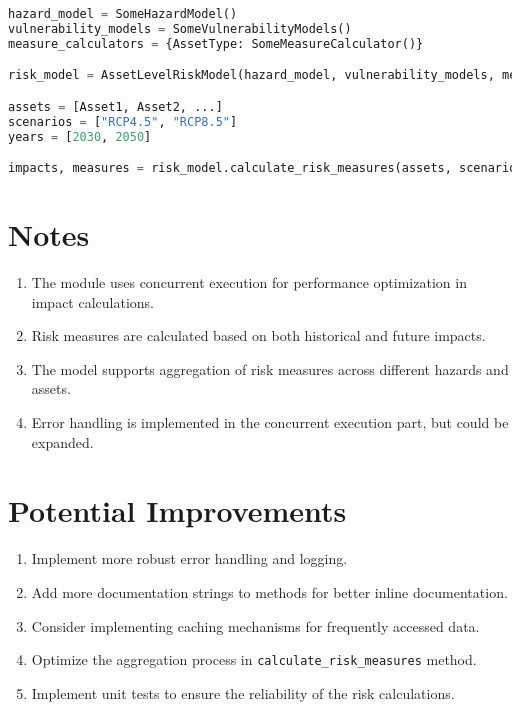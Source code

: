 \documentclass{article}
\begin{document}
\begin{lstlisting}[language=Python]
hazard_model = SomeHazardModel()
vulnerability_models = SomeVulnerabilityModels()
measure_calculators = {AssetType: SomeMeasureCalculator()}

risk_model = AssetLevelRiskModel(hazard_model, vulnerability_models, measure_calculators)

assets = [Asset1, Asset2, ...]
scenarios = ["RCP4.5", "RCP8.5"]
years = [2030, 2050]

impacts, measures = risk_model.calculate_risk_measures(assets, scenarios, years)
\end{lstlisting}

\section{Notes}

\begin{enumerate}
    \item The module uses concurrent execution for performance optimization in impact calculations.
    \item Risk measures are calculated based on both historical and future impacts.
    \item The model supports aggregation of risk measures across different hazards and assets.
    \item Error handling is implemented in the concurrent execution part, but could be expanded.
\end{enumerate}

\section{Potential Improvements}

\begin{enumerate}
    \item Implement more robust error handling and logging.
    \item Add more documentation strings to methods for better inline documentation.
    \item Consider implementing caching mechanisms for frequently accessed data.
    \item Optimize the aggregation process in \texttt{calculate\_risk\_measures} method.
    \item Implement unit tests to ensure the reliability of the risk calculations.
\end{enumerate}
\end{document}
